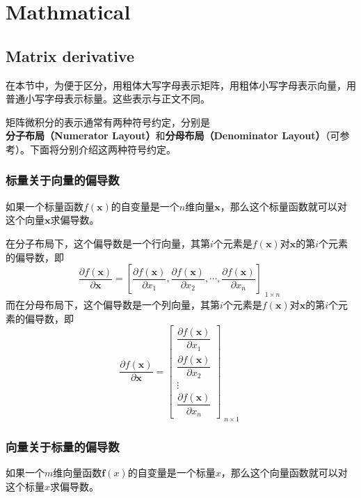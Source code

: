 \appendix
\chapter{Mathmatical}

\section{Matrix derivative}
\label{sec:matrix_derivative}

\begin{wenxintishi}
	在本节中，为便于区分，用粗体大写字母表示矩阵，用粗体小写字母表示向量，用普通小写字母表示标量。这些表示与正文不同。
\end{wenxintishi}

矩阵微积分的表示通常有两种符号约定，分别是\textbf{分子布局（Numerator Layout）}和\textbf{分母布局（Denominator Layout）}（可参考\cite{matrix_cookbook}）。下面将分别介绍这两种符号约定。

\subsection{标量关于向量的偏导数}
如果一个标量函数$f(\bm{x})$的自变量是一个$n$维向量$\bm{x}$，那么这个标量函数就可以对这个向量$\bm{x}$求偏导数。

在分子布局下，这个偏导数是一个行向量，其第$i$个元素是$f(\bm{x})$对$\bm{x}$的第$i$个元素的偏导数，即
\begin{equation}
	\frac{\partial f(\bm{x})}{\partial \bm{x}}
	=\left[\frac{\partial f(\bm{x})}{\partial x_1},\frac{\partial f(\bm{x})}{\partial x_2},\cdots,\frac{\partial f(\bm{x})}{\partial x_n}\right]_{\substack{\scriptstyle 1\times n}}
\end{equation}
而在分母布局下，这个偏导数是一个列向量，其第$i$个元素是$f(\bm{x})$对$\bm{x}$的第$i$个元素的偏导数，即
\begin{equation}
	\frac{\partial f(\bm{x})}{\partial \bm{x}}
	=\begin{bmatrix}
		\dfrac{\partial f(\bm{x})}{\partial x_1}\\[2ex]
		\dfrac{\partial f(\bm{x})}{\partial x_2}\\[2ex]
		\vdots\\[2ex]
		\dfrac{\partial f(\bm{x})}{\partial x_n}
	\end{bmatrix}_{\substack{\scriptstyle n\times 1}}
\end{equation}

\subsection{向量关于标量的偏导数}
如果一个$m$维向量函数$\bm{f}(x)$的自变量是一个标量$x$，那么这个向量函数就可以对这个标量$x$求偏导数。


